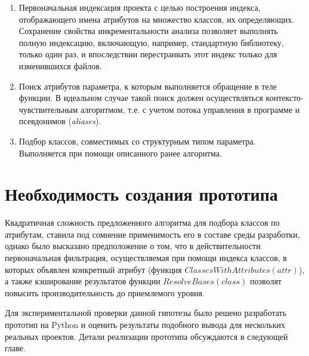 \begin{enumerate}
  \item Первоначальная индексация проекта с целью построения
    индекса, отображающего имена атрибутов на множество классов, их определяющих.
    Сохранение свойства инкрементальности анализа позволяет выполнять полную
    индексацию, включающую, например, стандартную библиотеку, только один раз,
    и впоследствии перестраивать этот индекс только для изменившихся файлов.

  \item Поиск атрибутов параметра, к которым выполняется обращение в теле
    функции. В идеальном случае такой поиск должен осуществляться
    контексто-чувствительным алгоритмом, т.е. с учетом потока управления в
    программе и псевдонимов (\emph{aliases}).

  \item Подбор классов, совместимых со структурным типом параметра.
    Выполняется при помощи описанного ранее алгоритма.

\end{enumerate}


\section{Необходимость создания прототипа}
\label{sec:prototype-necessity}

Квадратичная сложность предложенного алгоритма для подбора классов по атрибутам,
ставила под сомнение применимость его в составе среды разработки, однако было
высказано предположение о том, что в действительности первоначальная фильтрация,
осуществляемая при помощи индекса классов, в которых объявлен конкретный
атрибут (функция $ClassesWithAttributes(attr)$), а также кэширование результатов
функции $ResolveBases(class)$ позволят повысить производительность до
приемлемого уровня.

Для экспериментальной проверки данной гипотезы было решено разработать прототип
на Python и оценить результаты подобного вывода для нескольких реальных
проектов. Детали реализации прототипа обсуждаются в следующей главе.




